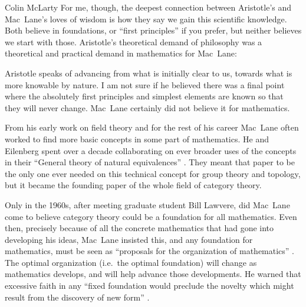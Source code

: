 \begin{artengenv}{Colin McLarty}
For me, though, the deepest connection between Aristotle's and Mac~Lane's loves of wisdom is how they say we gain this scientific knowledge.  Both believe in foundations, or ``first principles'' if you prefer, but neither believes we start with those. Aristotle's theoretical demand of philosophy was a theoretical and practical demand in mathematics for Mac~Lane:


Aristotle speaks of advancing from what is initially clear to us, towards what is more knowable by nature.  I am not sure if he believed there was a final point where the absolutely first principles and simplest elements are known so that they will never change.  Mac~Lane certainly did not believe it for mathematics.

From his early work on field theory \parencite{MacSchZero,MacSchNorm} and for the rest of his career Mac~Lane often worked to find more basic concepts in some part of mathematics. He and Eilenberg spent over a decade collaborating on ever broader uses of the concepts in their ``General theory of natural equivalences'' \parencite{GenTh}.  They meant that paper to be the only one ever needed on this technical concept for group theory and topology, but it became the founding paper of the whole field of category theory.

Only in the 1960s, after meeting graduate student Bill Lawvere, did Mac~Lane come to believe category theory could be a foundation for all mathematics.  Even then, precisely because of all the concrete mathematics that had gone into developing his ideas, Mac~Lane insisted this, and any foundation for mathematics, must be seen as ``proposals for the organization of mathematics'' \parencite[p.~406]{MFF}.  The optimal organization (i.e.~the optimal foundation) will change as mathematics develops, and will help advance those developments.  He warned that excessive faith in any ``fixed foundation would preclude the novelty which might result from the discovery of new form'' \parencite[p.~455]{MFF}.



\end{artengenv}
